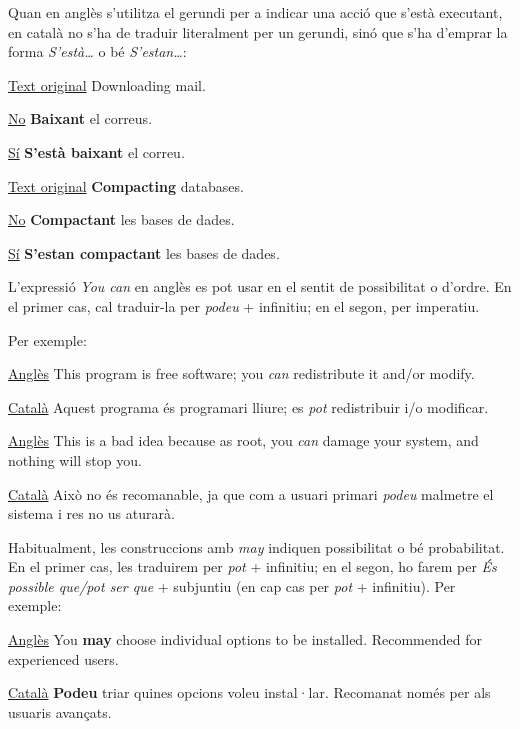 \documentclass[9pt]{cheatsheet}
\begin{document}
\begin{multicols*}{3}

Quan en anglès s'utilitza el gerundi per a indicar una acció que s'està executant, en català no s'ha de traduir literalment per un gerundi, sinó que s'ha d'emprar la forma \emph{S'està…} o bé \emph{S'estan…}:

\underline {Text original} Downloading mail.

\underline {No} \textbf{Baixant} el correus.

\underline {Sí} \textbf{S'està baixant} el correu.


\underline {Text original} \textbf{Compacting} databases.

\underline {No} \textbf{Compactant} les bases de dades.

\underline {Sí} \textbf{S'estan compactant} les bases de dades.



L'expressió \emph{You can} en anglès es pot usar en el sentit de possibilitat o d'ordre. En el primer cas, cal traduir-la per \emph{podeu} + infinitiu; en el segon, per imperatiu.

Per exemple:

\underline {Anglès} This program is free software; you \emph{can} redistribute it and/or modify.

\underline {Català} Aquest programa és programari lliure; es \emph{pot} redistribuir i/o modificar.

\underline {Anglès} This is a bad idea because as root, you \emph{can} damage your system, and nothing will stop you.

\underline {Català} Això no és recomanable, ja que com a usuari primari \emph{podeu} malmetre el sistema i res no us aturarà.



Habitualment, les construccions amb \emph{may} indiquen possibilitat o bé probabilitat. En el primer cas, les traduirem per \emph{pot} + infinitiu; en el segon, ho farem per \emph{És possible que/pot ser que} + subjuntiu (en cap cas per \emph{pot} + infinitiu). Per exemple:

\underline {Anglès} You \textbf{may} choose individual options to be installed. Recommended for experienced users.

\underline {Català} \textbf{Podeu} triar quines opcions voleu instal·lar. Recomanat només per als usuaris avançats.


\end{multicols*}
\end{document}
